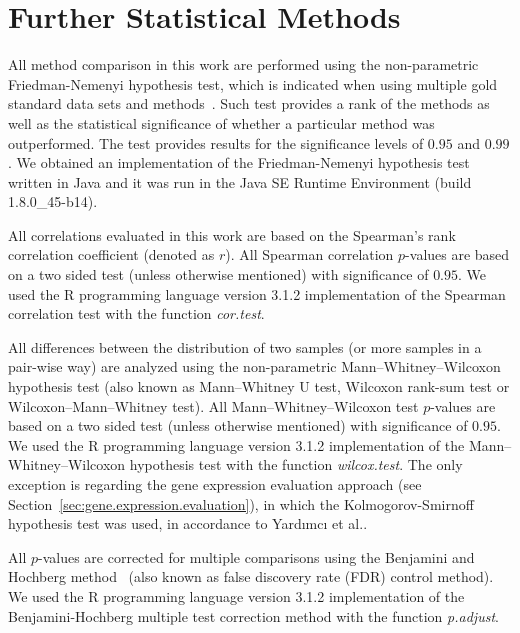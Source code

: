 \section{Further Statistical Methods}
\label{sec:further.statistical.methods}

All method comparison in this work are performed using the non-parametric Friedman-Nemenyi hypothesis test, which is indicated when using multiple gold standard data sets and methods~\cite{demsar2006}. Such test provides a rank of the methods as well as the statistical significance of whether a particular method was outperformed. The test provides results for the significance levels of $0.95$ and $0.99$. We obtained an implementation of the Friedman-Nemenyi hypothesis test written in Java and it was run in the Java SE Runtime Environment (build 1.8.0\_45-b14).

All correlations evaluated in this work are based on the Spearman's rank correlation coefficient (denoted as $r$). All Spearman correlation $p$-values are based on a two sided test (unless otherwise mentioned) with significance of $0.95$. We used the R programming language version 3.1.2 implementation of the Spearman correlation test with the function \emph{cor.test}.

All differences between the distribution of two samples (or more samples in a pair-wise way) are analyzed using the non-parametric Mann–Whitney–Wilcoxon hypothesis test (also known as Mann–Whitney U test, Wilcoxon rank-sum test or Wilcoxon–Mann–Whitney test). All Mann–Whitney–Wilcoxon test $p$-values are based on a two sided test (unless otherwise mentioned) with significance of $0.95$. We used the R programming language version 3.1.2 implementation of the Mann–Whitney–Wilcoxon hypothesis test with the function \emph{wilcox.test}. The only exception is regarding the gene expression evaluation approach (see Section~\ref{sec:gene.expression.evaluation}), in which the Kolmogorov-Smirnoff hypothesis test was used, in accordance to Yard{\i}mc{\i} et al.\cite{yardimci2014}.

All $p$-values are corrected for multiple comparisons using the Benjamini and Hochberg method~\cite{benjamini1995} (also known as false discovery rate (FDR) control method). We used the R programming language version 3.1.2 implementation of the Benjamini-Hochberg multiple test correction method with the function \emph{p.adjust}.

